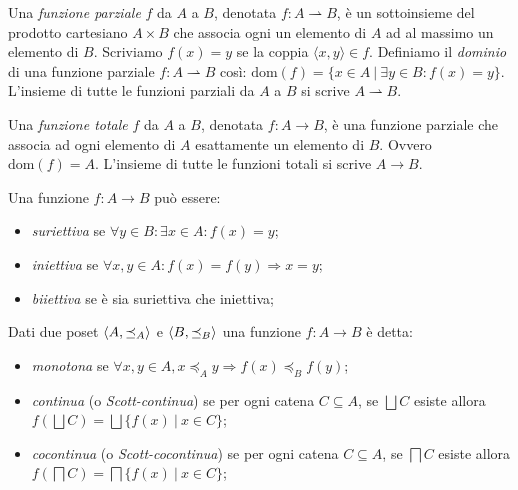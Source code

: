 \begin{definition}
Una \textit{funzione parziale} \(f\) da \(A\) a \(B\), denotata \(f:A\rightharpoonup B\), è un sottoinsieme del prodotto cartesiano \(A\times B\) che associa ogni un elemento di \(A\) ad al massimo un elemento di \(B\). Scriviamo \(f(x)=y\) se la coppia \(\langle x, y\rangle\in f\). Definiamo il \textit{dominio} di una funzione parziale \(f:A\rightharpoonup B\) così: \(\textrm{dom}(f)=\{x\in A\ |\ \exists y\in B:f(x)=y\}\). L'insieme di tutte le funzioni parziali da \(A\) a \(B\) si scrive \(A\rightharpoonup B\).
\end{definition}

\begin{definition}
Una \textit{funzione totale} \(f\) da \(A\) a \(B\), denotata \(f:A\rightarrow B\), è una funzione parziale che associa ad ogni elemento di \(A\) esattamente un elemento di \(B\). Ovvero \(\textrm{dom}(f)=A\). L'insieme di tutte le funzioni totali si scrive \(A\rightarrow B\).
\end{definition}

\begin{definition}
Una funzione \(f:A\rightarrow B\) può essere:
\begin{itemize}
    \item \textit{suriettiva} se \(\forall y\in B : \exists x\in A: f(x)=y\);
    \item \textit{iniettiva} se \(\forall x,y\in A : f(x)=f(y)\Rightarrow x=y\);
    \item \textit{biiettiva} se è sia suriettiva che iniettiva;
\end{itemize}
Dati due poset \(\langle A, \preceq_{A}\rangle\) e \(\langle B, \preceq_{B}\rangle\) una funzione \(f:A\rightarrow B\) è detta:
\begin{itemize}
    \item \textit{monotona} se \(\forall x,y\in A, x\preceq_A y\Rightarrow f(x)\preceq_B f(y)\);
    \item \textit{continua} (o \textit{Scott-continua}) se per ogni catena \(C\subseteq A\), se \(\bigsqcup C\) esiste allora \(f(\bigsqcup C)=\bigsqcup\{f(x)\ |\ x\in C\}\);
    \item \textit{cocontinua} (o \textit{Scott-cocontinua}) se per ogni catena \(C\subseteq A\), se \(\bigsqcap C\) esiste allora \(f(\bigsqcap C)=\bigsqcap\{f(x)\ |\ x\in C\}\);
\end{itemize}
\end{definition}

